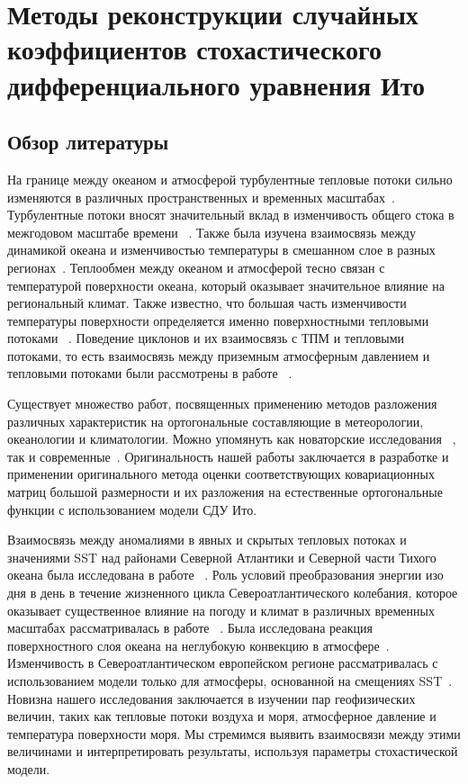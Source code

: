 \chapter{Методы реконструкции случайных коэффициентов стохастического дифференциального уравнения Ито}
\label{ch:Methods}

\section{Обзор литературы}
\label{sec:ch1/Literature}

На границе между океаном и атмосферой турбулентные тепловые потоки сильно изменяются в различных пространственных и временных масштабах~\cite{small2019air, tian2017air}. Турбулентные потоки вносят значительный вклад в изменчивость общего стока в межгодовом масштабе времени ~\cite{bentamy2017review}.
Также была изучена взаимосвязь между динамикой океана и изменчивостью температуры в смешанном слое в разных регионах~\cite{ashin2019observed, schmeisser2019role}. Теплообмен между океаном и атмосферой тесно связан с температурой поверхности океана, который оказывает значительное влияние на региональный климат. Также известно, что большая часть изменчивости температуры поверхности определяется именно поверхностными тепловыми потоками ~\cite{patrizio2021quantifying}. 
Поведение циклонов и их взаимосвязь с ТПМ и тепловыми потоками, то есть взаимосвязь между приземным атмосферным давлением и тепловыми потоками были рассмотрены в работе ~\cite{tilinina2018association}.

Существует множество работ, посвященных применению методов разложения различных характеристик на ортогональные составляющие в метеорологии, океанологии и климатологии. Можно упомянуть как новаторские исследования ~\cite{lorenz1956empirical, bagrov1959analytic,Obukhov1960,Yudin1968}, так и современные~\cite{kobayashi2015jra}. Оригинальность нашей работы заключается в разработке и применении оригинального метода оценки соответствующих ковариационных матриц большой размерности и их разложения на естественные ортогональные функции с использованием модели СДУ Ито.

Взаимосвязь между аномалиями в явных и скрытых тепловых потоках и значениями SST над районами Северной Атлантики и Северной части Тихого океана была исследована в работе ~\cite{cayan1992latent}. Роль условий преобразования энергии изо дня в день в течение жизненного цикла Североатлантического колебания, которое оказывает существенное влияние на погоду и климат в различных временных масштабах рассматривалась в работе ~\cite{kim2024phase}. Была исследована реакция поверхностного слоя океана на неглубокую конвекцию в атмосфере~\cite{brilouet2024numerical}. Изменчивость в Североатлантическом европейском регионе рассматривалась с использованием модели только для атмосферы, основанной на смещениях SST~\cite{keeley2012impact}. Новизна нашего исследования заключается в изучении пар геофизических величин, таких как тепловые потоки воздуха и моря, атмосферное давление и температура поверхности моря. Мы стремимся выявить взаимосвязи между этими величинами и интерпретировать результаты, используя параметры стохастической модели.


